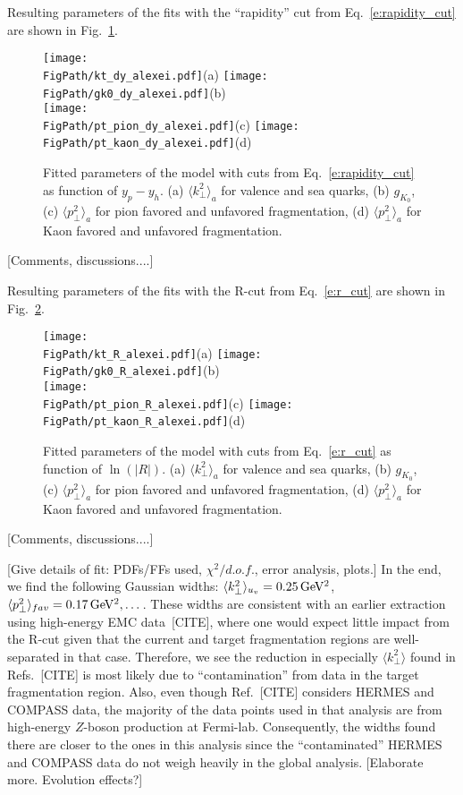 \documentclass[final,3p,times,onecolumn,sort&compress,hidelinks]{elsarticle}
\newcommand\3[1]{\boldsymbol{#1}}
\newcommand*{\FigPath}{../Figs/}%
\begin{document}
\newpage
Resulting parameters of the fits with  the ``rapidity'' cut from Eq.~\eqref{e:rapidity_cut} 
are shown in Fig.~\ref{Fig:rapidity_cut}.
\begin{figure}[htb!]
\centering
\texttt{[image: \\FigPath/kt\_dy\_alexei.pdf]}{\tiny(a)}%
\texttt{[image: \\FigPath/gk0\_dy\_alexei.pdf]}{\tiny(b)}\\%
\texttt{[image: \\FigPath/pt\_pion\_dy\_alexei.pdf]}{\tiny(c)}%
\texttt{[image: \\FigPath/pt\_kaon\_dy\_alexei.pdf]}{\tiny(d)}%
\caption{\label{Fig:rapidity_cut}
Fitted parameters of the model with cuts from Eq.~\eqref{e:rapidity_cut} as function of $y_p-y_h$. (a) $\langle k_\perp^2 \rangle_a$ for valence and sea quarks,
(b) $g_{K_0}$,
(c) $\langle p_\perp^2 \rangle_a$ for pion favored and unfavored fragmentation, (d) $\langle p_\perp^2 \rangle_a$ for Kaon favored and unfavored fragmentation.
}
\end{figure}

[Comments, discussions....]
\newpage


Resulting parameters of the fits with  the R-cut from Eq.~\eqref{e:r_cut} 
are shown in Fig.~\ref{Fig:r_cut}.
\begin{figure}[htb!]
\centering
\texttt{[image: \\FigPath/kt\_R\_alexei.pdf]}{\tiny(a)}%
\texttt{[image: \\FigPath/gk0\_R\_alexei.pdf]}{\tiny(b)}\\%
\texttt{[image: \\FigPath/pt\_pion\_R\_alexei.pdf]}{\tiny(c)}%
\texttt{[image: \\FigPath/pt\_kaon\_R\_alexei.pdf]}{\tiny(d)}%
\caption{\label{Fig:r_cut}
Fitted parameters of the model with cuts from Eq.~\eqref{e:r_cut} as function of $\ln(|R|)$. (a) $\langle k_\perp^2 \rangle_a$ for valence and sea quarks,
(b) $g_{K_0}$,
(c) $\langle p_\perp^2 \rangle_a$ for pion favored and unfavored fragmentation, (d) $\langle p_\perp^2 \rangle_a$ for Kaon favored and unfavored fragmentation.
}
\end{figure}

[Comments, discussions....]
\newpage


[Give details of fit: PDFs/FFs used, $\chi^2/d.o.f.$, error analysis, plots.]  In the end, we find the following Gaussian widths: $\langle k_\perp^2\rangle_{u_v} = 0.25\,{\rm GeV^2}$, $\langle p_\perp^2\rangle_{fav} = 0.17\,{\rm GeV^2}, \dots$.  These widths are consistent with an earlier extraction using high-energy EMC data~[CITE], where one would expect little impact from the R-cut given that the current and target fragmentation regions are well-separated in that case.  Therefore, we see the reduction in especially $\langle k_\perp^2\rangle$ found in Refs.~[CITE] is most likely due to ``contamination'' from data in the target fragmentation region.  Also, even though Ref.~[CITE] considers HERMES and COMPASS data, the majority of the data points used in that analysis are from high-energy $Z$-boson production at Fermi-lab.  Consequently, the widths found there are closer to the ones in this analysis since the ``contaminated'' HERMES and COMPASS data do not weigh heavily in the global analysis.  [Elaborate more.  Evolution effects?]
\end{document}
